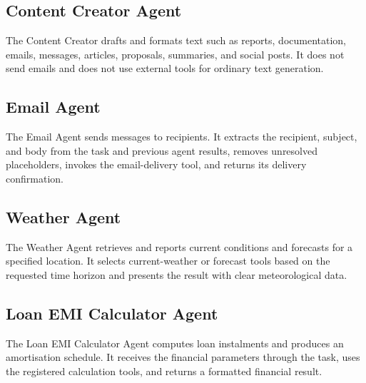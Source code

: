 \subsection{Content Creator Agent}
The Content Creator drafts and formats text such as reports, documentation,
emails, messages, articles, proposals, summaries, and social posts. It does
not send emails and does not use external tools for ordinary text generation.

\subsection{Email Agent}
The Email Agent sends messages to recipients. It extracts the recipient,
subject, and body from the task and previous agent results, removes unresolved
placeholders, invokes the email-delivery tool, and returns its delivery
confirmation.

\subsection{Weather Agent}
The Weather Agent retrieves and reports current conditions and forecasts for a
specified location. It selects current-weather or forecast tools based on the
requested time horizon and presents the result with clear meteorological data.

\subsection{Loan EMI Calculator Agent}
The Loan EMI Calculator Agent computes loan instalments and produces an
amortisation schedule. It receives the financial parameters through the task,
uses the registered calculation tools, and returns a formatted financial
result.


